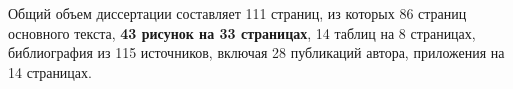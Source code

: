 Общий объем диссертации составляет 111 страниц, из которых 86 страниц основного текста, \textbf{43 рисунок на 33 страницах}, 14 таблиц на 8 страницах, библиография из 115 источников, включая 28 публикаций автора, приложения на 14 страницах.




%
